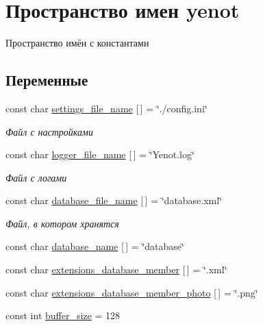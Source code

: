 \hypertarget{namespaceyenot}{}\section{Пространство имен yenot}
\label{namespaceyenot}


Пространство имён с константами  


\subsection*{Переменные}
\begin{DoxyCompactItemize}
\item 
const char \mbox{\hyperlink{namespaceyenot_adc33110d5c91abdee044c45cd5c725b1}{settings\+\_\+file\+\_\+name}} \mbox{[}$\,$\mbox{]} = \char`\"{}./config.\+ini\char`\"{}
\begin{DoxyCompactList}\small\item\em Файл с настройками \end{DoxyCompactList}\item 
const char \mbox{\hyperlink{namespaceyenot_ab82af39640477c63378716f6699d49fe}{logger\+\_\+file\+\_\+name}} \mbox{[}$\,$\mbox{]} = \char`\"{}Yenot.\+log\char`\"{}
\begin{DoxyCompactList}\small\item\em Файл с логами \end{DoxyCompactList}\item 
const char \mbox{\hyperlink{namespaceyenot_ac18180ab326731ce58145fe9049c49b9}{database\+\_\+file\+\_\+name}} \mbox{[}$\,$\mbox{]} = \char`\"{}database.\+xml\char`\"{}
\begin{DoxyCompactList}\small\item\em Файл, в котором хранятся \end{DoxyCompactList}\item 
const char \mbox{\hyperlink{namespaceyenot_a5c402b62f742f34e9e42756075df6ed2}{database\+\_\+name}} \mbox{[}$\,$\mbox{]} = \char`\"{}database\char`\"{}
\item 
const char \mbox{\hyperlink{namespaceyenot_a33ac96c1605ea0acb1f29aaf1ace51da}{extensions\+\_\+database\+\_\+member}} \mbox{[}$\,$\mbox{]} = \char`\"{}.xml\char`\"{}
\item 
const char \mbox{\hyperlink{namespaceyenot_aad9119112273f919a9be40dd3cd6f883}{extensions\+\_\+database\+\_\+member\+\_\+photo}} \mbox{[}$\,$\mbox{]} = \char`\"{}.png\char`\"{}
\item 
const int \mbox{\hyperlink{namespaceyenot_adc382d9413986f36649df4f983cf1ebe}{buffer\+\_\+size}} = 128

\end{DoxyCompactItemize}
